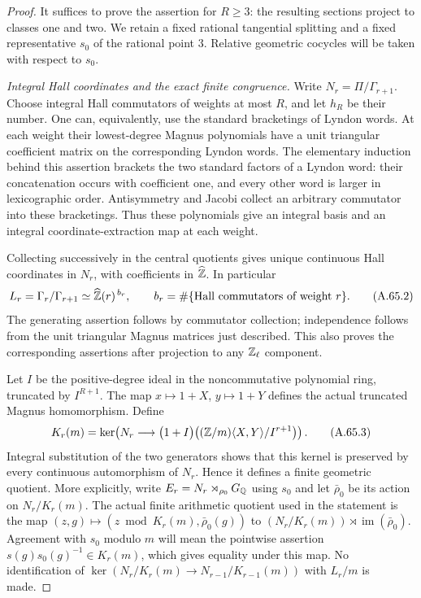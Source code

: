 \begin{proof}
It suffices to prove the assertion for $R\geq3$: the resulting sections
project to classes one and two.  We retain a fixed rational tangential
splitting and a fixed representative $s_0$ of the rational point $3$.
Relative geometric cocycles will be taken with respect to $s_0$.

\emph{Integral Hall coordinates and the exact finite congruence.}
Write $N_r=\Pi/\Gamma_{r+1}$.  Choose integral Hall commutators of weights
at most $R$, and let $h_R$ be their number.  One can, equivalently, use
the standard bracketings of Lyndon words.  At each weight their
lowest-degree Magnus polynomials have a unit triangular coefficient
matrix on the corresponding Lyndon words.  The elementary induction
behind this assertion brackets the two standard factors of a Lyndon
word: their concatenation occurs with coefficient one, and every other
word is larger in lexicographic order.  Antisymmetry and Jacobi collect
an arbitrary commutator into these bracketings.  Thus these polynomials
give an integral basis and an integral coordinate-extraction map at
each weight.

Collecting successively in the central quotients gives unique continuous
Hall coordinates in $N_r$, with coefficients in $\widehat{\mathbb Z}$.  In
particular
\[
 L_r=\Gamma_r/\Gamma_{r+1}
       \simeq\widehat{\mathbb Z}(r)^{\,b_r},\qquad
 b_r=\#\{\text{Hall commutators of weight }r\}.
 \tag{A.65.2}
\]
The generating assertion follows by commutator collection; independence
follows from the unit triangular Magnus matrices just described.  This
also proves the corresponding assertions after projection to any
$\mathbb Z_\ell$ component.

Let $I$ be the positive-degree ideal in the noncommutative polynomial
ring, truncated by $I^{R+1}$.  The map $x\mapsto1+X$, $y\mapsto1+Y$
defines the actual truncated Magnus homomorphism.  Define
\[
 K_r(m)=
 \ker\!\left(N_r\longrightarrow
      \bigl(1+I\bigr)
       \bigl((\mathbb Z/m)\langle X,Y\rangle/I^{r+1}\bigr)\right).
 \tag{A.65.3}
\]
Integral substitution of the two generators shows that this kernel is
preserved by every continuous automorphism of $N_r$.  Hence it defines
a finite geometric quotient.  More explicitly, write
$E_r=N_r\rtimes_{\rho_0}G_\mathbb Q$ using $s_0$ and let
$\bar\rho_0$ be its action on $N_r/K_r(m)$.
The actual finite arithmetic quotient used in the statement is the map
$(z,g)\mapsto(z\bmod K_r(m),\bar\rho_0(g))$ to
$(N_r/K_r(m))\rtimes\operatorname{im}(\bar\rho_0)$.
Agreement with $s_0$ modulo $m$ will mean the pointwise assertion
$s(g)s_0(g)^{-1}\in K_r(m)$, which gives equality under this map.
No identification of
$\ker(N_r/K_r(m)\to N_{r-1}/K_{r-1}(m))$
with $L_r/m$ is made.


\end{proof}
